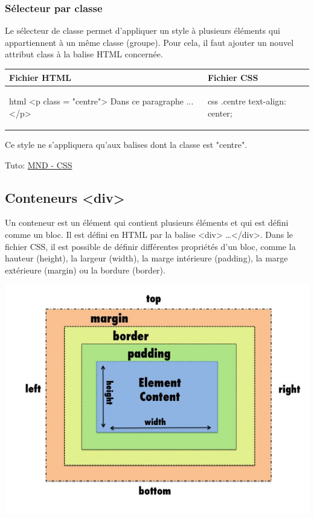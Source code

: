 \documentclass[a4paper,11pt]{article}
\begin{document}
\subsubsection{Sélecteur par classe}
Le sélecteur de classe permet d'appliquer un style à plusieurs éléments qui appartiennent à un même classe (groupe). Pour cela, il faut ajouter un nouvel attribut class à la balise HTML concernée.\par

\begin{tabular}{|l|l|}
\hline
\centering Fichier HTML & Fichier CSS\tabularnewline
\hline
\begin{minipage}{1\textwidth}
\begin{code}{html}
<p class = "centre">
  Dans ce paragraphe ...
</p>
\end{code}
\end{minipage}&
\begin{minipage}{1\textwidth}
\begin{code}{css}
.centre{
  text-align: center;
}
\end{code}
\end{minipage}\tabularnewline
\hline
\end{tabular}\par
Ce style ne s'appliquera qu'aux balises dont la classe est "centre".

Tuto: \href{https://developer.mozilla.org/fr/docs/Learn/Getting_started_with_the_web/CSS_basics}{MND - CSS}


\subsection{Conteneurs <div>}
\begin{multicols}{2}
\begin{minipage}{1\textwidth}
Un conteneur est un élément qui contient plusieurs éléments et qui est défini comme un bloc.
Il est défini en HTML par la balise <div> \dots </div>. Dans le fichier CSS, il est possible de définir différentes propriétés d'un bloc, comme la hauteur (height), la largeur (width), la marge intérieure (padding), la marge extérieure (margin) ou la bordure (border).
\end{minipage}
\includegraphics[width= 1\textwidth]{images/conteneur.png}
\end{multicols}
\end{document}
